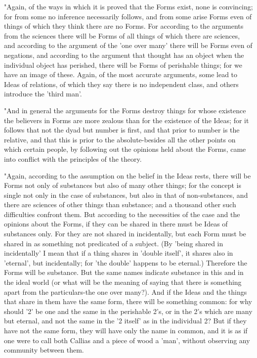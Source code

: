 "Again, of the ways in which it is proved that the Forms exist, none
is convincing; for from some no inference necessarily follows, and
from some arise Forms even of things of which they think there are
no Forms. For according to the arguments from the sciences there will
be Forms of all things of which there are sciences, and according
to the argument of the 'one over many' there will be Forms even of
negations, and according to the argument that thought has an object
when the individual object has perished, there will be Forms of perishable
things; for we have an image of these. Again, of the most accurate
arguments, some lead to Ideas of relations, of which they say there
is no independent class, and others introduce the 'third man'.

"And in general the arguments for the Forms destroy things for whose
existence the believers in Forms are more zealous than for the existence
of the Ideas; for it follows that not the dyad but number is first,
and that prior to number is the relative, and that this is prior to
the absolute-besides all the other points on which certain people,
by following out the opinions held about the Forms, came into conflict
with the principles of the theory. 

"Again, according to the assumption on the belief in the Ideas rests,
there will be Forms not only of substances but also of many other
things; for the concept is single not only in the case of substances,
but also in that of non-substances, and there are sciences of other
things than substance; and a thousand other such difficulties confront
them. But according to the necessities of the case and the opinions
about the Forms, if they can be shared in there must be Ideas of substances
only. For they are not shared in incidentally, but each Form must
be shared in as something not predicated of a subject. (By 'being
shared in incidentally' I mean that if a thing shares in 'double itself',
it shares also in 'eternal', but incidentally; for 'the double' happens
to be eternal.) Therefore the Forms will be substance. But the same
names indicate substance in this and in the ideal world (or what will
be the meaning of saying that there is something apart from the particulars-the
one over many?). And if the Ideas and the things that share in them
have the same form, there will be something common: for why should
'2' be one and the same in the perishable 2's, or in the 2's which
are many but eternal, and not the same in the '2 itself' as in the
individual 2? But if they have not the same form, they will have only
the name in common, and it is as if one were to call both Callias
and a piece of wood a 'man', without observing any community between
them. 

